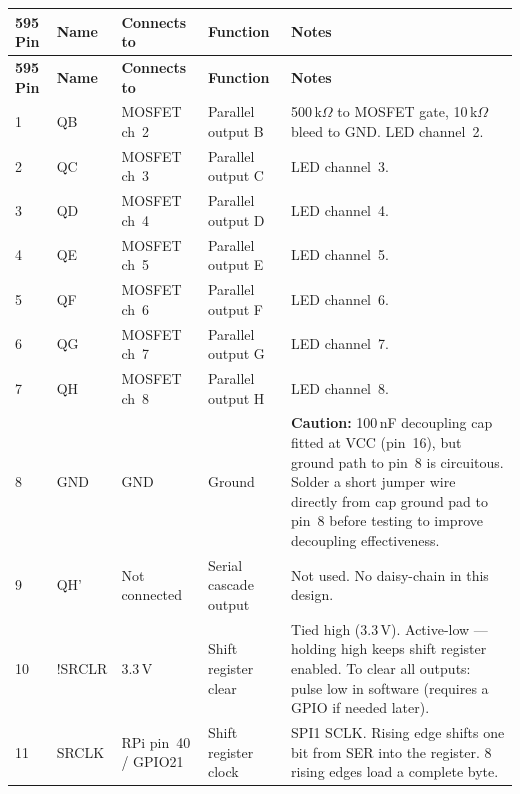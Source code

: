\documentclass[11pt,a4paper]{article}
\begin{document}
\begin{longtable}{C{1.2cm} C{1.4cm} C{1.6cm} L{3.2cm} L{6.8cm}}
  \toprule
  \color{white}\textbf{595 Pin} &
  \color{white}\textbf{Name} &
  \color{white}\textbf{Connects to} &
  \color{white}\textbf{Function} &
  \color{white}\textbf{Notes} \\
  \midrule
  \endfirsthead
  \toprule
  \color{white}\textbf{595 Pin} &
  \color{white}\textbf{Name} &
  \color{white}\textbf{Connects to} &
  \color{white}\textbf{Function} &
  \color{white}\textbf{Notes} \\
  \midrule
  \endhead
  \bottomrule
  \endfoot

  1 & QB & MOSFET ch~2 & Parallel output B &
    500\,k$\Omega$ to MOSFET gate, 10\,k$\Omega$ bleed to GND.
    LED channel~2. \\
  2 & QC & MOSFET ch~3 & Parallel output C & LED channel~3. \\
  3 & QD & MOSFET ch~4 & Parallel output D & LED channel~4. \\
  4 & QE & MOSFET ch~5 & Parallel output E & LED channel~5. \\
  5 & QF & MOSFET ch~6 & Parallel output F & LED channel~6. \\
  6 & QG & MOSFET ch~7 & Parallel output G & LED channel~7. \\
  7 & QH & MOSFET ch~8 & Parallel output H & LED channel~8. \\
  8 & GND & GND & Ground &
    \textbf{Caution:} 100\,nF decoupling cap fitted at VCC (pin~16),
    but ground path to pin~8 is circuitous.
    Solder a short jumper wire directly from cap ground pad to pin~8
    before testing to improve decoupling effectiveness. \\
  9 & QH' & Not connected & Serial cascade output &
    Not used. No daisy-chain in this design. \\
  10 & !SRCLR & 3.3\,V & Shift register clear &
    Tied high (3.3\,V). Active-low --- holding high keeps shift register enabled.
    To clear all outputs: pulse low in software (requires a GPIO if needed later). \\
  11 & SRCLK & RPi pin~40 / GPIO21 & Shift register clock &
    SPI1 SCLK. Rising edge shifts one bit from SER into the register.
    8 rising edges load a complete byte. \\

\end{longtable}
\end{document}

